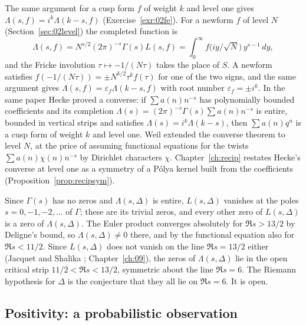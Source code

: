 The same argument for a cusp form $f$ of weight $k$ and level one gives $\Lambda(s,f)=i^k\Lambda(k-s,f)$ (Exercise~\ref{exr:02fe}). For a newform $f$ of level $N$ (Section~\ref{sec:02level}) the completed function is
\[
\Lambda(s,f)=N^{s/2}(2\pi)^{-s}\Gamma(s)L(s,f)=\int_0^\infty f\bigl(iy/\sqrt N\bigr)\,y^{s-1}\,dy,
\]
and the Fricke involution $\tau\mapsto-1/(N\tau)$ takes the place of $S$. A newform satisfies $f(-1/(N\tau))=\pm N^{k/2}\tau^kf(\tau)$ for one of the two signs, and the same argument gives $\Lambda(s,f)=\varepsilon_f\Lambda(k-s,f)$ with root number $\varepsilon_f=\pm i^k$. In the same paper Hecke proved a converse: if $\sum a(n)n^{-s}$ has polynomially bounded coefficients and its completion $\Lambda(s)=(2\pi)^{-s}\Gamma(s)\sum a(n)n^{-s}$ is entire, bounded in vertical strips and satisfies $\Lambda(s)=i^k\Lambda(k-s)$, then $\sum a(n)q^n$ is a cusp form of weight $k$ and level one. Weil \cite{weil1967} extended the converse theorem to level $N$, at the price of assuming functional equations for the twists $\sum a(n)\chi(n)n^{-s}$ by Dirichlet characters $\chi$. Chapter~\ref{ch:recip} restates Hecke's converse at level one as a symmetry of a P\'olya kernel built from the coefficients (Proposition~\ref{prop:recipsym}).

Since $\Gamma(s)$ has no zeros and $\Lambda(s,\Delta)$ is entire, $L(s,\Delta)$ vanishes at the poles $s=0,-1,-2,\dots$ of $\Gamma$; these are its trivial zeros, and every other zero of $L(s,\Delta)$ is a zero of $\Lambda(s,\Delta)$. The Euler product converges absolutely for $\Re s>13/2$ by Deligne's bound, so $\Lambda(s,\Delta)\neq0$ there, and by the functional equation also for $\Re s<11/2$. Since $L(s,\Delta)$ does not vanish on the line $\Re s=13/2$ either (Jacquet and Shalika \cite{jacquetshalika1976}; Chapter~\ref{ch:09}), the zeros of $\Lambda(s,\Delta)$ lie in the open critical strip $11/2<\Re s<13/2$, symmetric about the line $\Re s=6$. The Riemann hypothesis for $\Delta$ is the conjecture that they all lie on $\Re s=6$. It is open.

\subsection{Positivity: a probabilistic observation}

